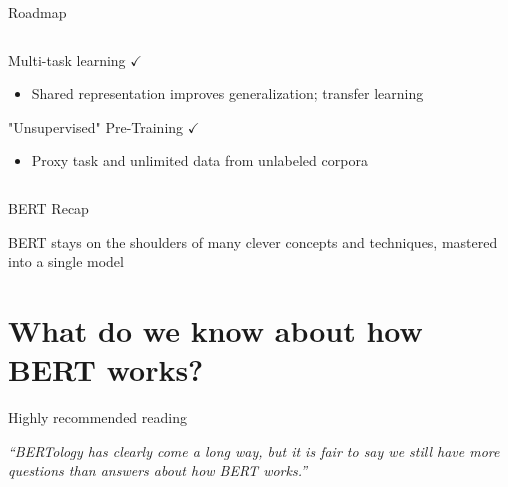 \documentclass[12pt,aspectratio=169,handout]{beamer}
\begin{document}
\begin{frame}{Roadmap}
\begin{columns}
\begin{column}{0.5\linewidth}
			
			Multi-task learning $\checkmark$
			
			\begin{itemize}
				\item {\scriptsize Shared representation improves generalization; transfer learning}
			\end{itemize}
			
			"Unsupervised" Pre-Training $\checkmark$
			
			\begin{itemize}
				\item {\scriptsize Proxy task and unlimited data from unlabeled corpora}
			\end{itemize}
			
		\end{column}
		
	\end{columns}
	
\end{frame}


\begin{frame}{BERT Recap}
	
	BERT stays on the shoulders of many clever concepts and techniques, mastered into a single model
	
\end{frame}

\section{What do we know about how BERT works?}

\begin{frame}{Highly recommended reading}
	
	\emph{``BERTology has clearly come a long way, but it is fair to say we still have more questions than answers about how BERT works.''}
	
	\bigskip
	
	
\end{frame}
\end{document}
